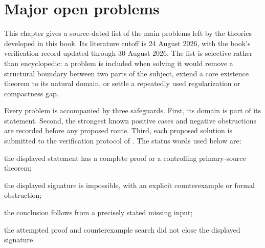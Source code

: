 \chapter{Major open problems}
\label{chap:major-open-problems}

This chapter gives a source-dated list of the main problems left by the
theories developed in this book.  Its literature cutoff is 24 August 2026,
with the book's verification record updated through 30 August 2026.  The list is
selective rather than encyclopedic: a problem is included when solving it
would remove a structural boundary between two parts of the subject, extend a
core existence theorem to its natural domain, or settle a repeatedly used
regularization or compactness gap.

Every problem is accompanied by three safeguards.  First, its domain is part
of its statement.  Second, the strongest known positive cases and negative
obstructions are recorded before any proposed route.  Third, each proposed
solution is submitted to the verification protocol of
.  The status words used below are:

\begin{description}[style=nextline,leftmargin=1.5em,labelindent=0pt,
  itemsep=.45\baselineskip,font=\normalfont\bfseries]
\item[Verified] the displayed statement has a complete proof or a controlling
primary-source theorem;
\item[Disproved] the displayed signature is impossible, with an explicit
counterexample or formal obstruction;
\item[Conditional] the conclusion follows from a precisely stated missing
input;
\item[Open] the attempted proof and counterexample search did not close the
displayed signature.
\end{description}

